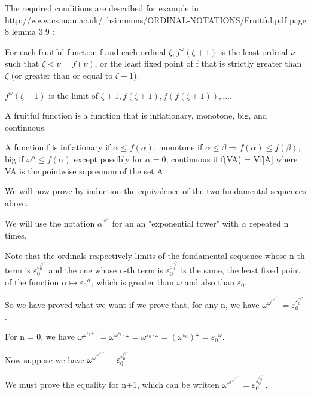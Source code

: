 \documentclass[10pt]{article}
\begin{document}
The required conditions are described for example in http://www.cs.man.ac.uk/~hsimmons/ORDINAL-NOTATIONS/Fruitful.pdf page 8 lemma 3.9 : 

For each fruitful function f and each ordinal \( \zeta, f^\omega(\zeta+1) \) is the least ordinal \( \nu \) such that \( \zeta < \nu = f(\nu) \), or the least fixed point of f that is strictly greater than \( \zeta \) (or greater than or equal to \( \zeta+1 \)). 

\( f^\omega(\zeta+1) \) is the limit of \( \zeta+1, f(\zeta+1), f(f(\zeta+1)), \ldots \). 

A fruitful function is a function that is inflationary, monotone, big, and continuous.

A function f is inflationary if \( \alpha \leq f(\alpha) \), monotone if \( \alpha \leq \beta \Rightarrow f(\alpha) \leq f(\beta) \), big if \( \omega^\alpha \leq f(\alpha) \) except possibly for \( \alpha = 0 \), continuous if f(VA) = Vf[A] where VA is the pointwise supremum of the set A.

\bigskip

We will now prove by induction the equivalence of the two fundamental sequences above.

We will use the notation \( \alpha^{\vdots^{\alpha^\beta}} \) for an an "exponential tower" with \( \alpha \) repeated n times. 


Note that the ordinals respectively limits of the fondamental sequence whose n-th term is \(\varepsilon_0^{\varepsilon_0^{\vdots^{{\varepsilon_0}^\omega}}} \) and the one whose n-th term is \( \varepsilon_0^{\varepsilon_0^{\vdots^{\varepsilon_0^{\varepsilon_0}}}} \) is the same, the least fixed point of the function \( \alpha \mapsto {\varepsilon_0}^\alpha \), which is greater than \( \omega \) and also than \( \varepsilon_0 \).

So we have proved what we want if we prove that, for any n, we have \( \omega^{\omega^{\vdots^{\omega^{\omega^{\varepsilon_0+1}}}}} = \varepsilon_0^{\varepsilon_0^{\vdots^{{\varepsilon_0}^\omega}}} \). 

For n = 0, we have \( \omega^{\omega^{\varepsilon_0+1}} = \omega^{\omega^{\varepsilon_0}\cdot\omega} = \omega^{\varepsilon_0\cdot\omega} = (\omega^{\varepsilon_0})^\omega = {\varepsilon_0}^\omega \). 

Now suppose we have \( \omega^{\omega^{\vdots^{\omega^{\omega^{\varepsilon_0+1}}}}} = \varepsilon_0^{\varepsilon_0^{\vdots^{{\varepsilon_0}^\omega}}} \). 

We must prove the equality for n+1, which can be written \( \omega^{\omega^{\omega^{\vdots^{\omega^{\omega^{\varepsilon_0+1}}}}}} = \varepsilon_0^{\varepsilon_0^{\varepsilon_0^{\vdots^{{\varepsilon_0}^\omega}}}} \). 
\end{document}
